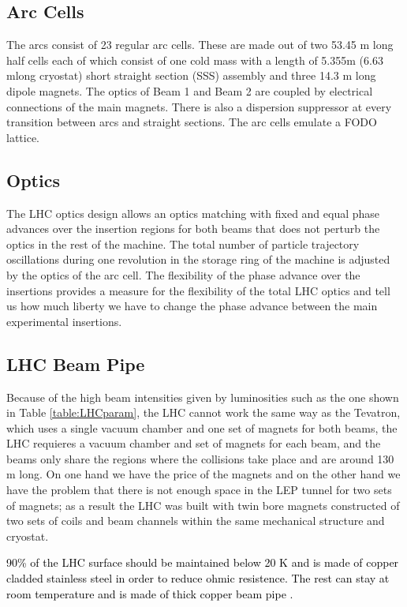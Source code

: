 \subsection{Arc Cells}
The arcs consist of 23 regular arc cells. These are made out of two 53.45 m long half cells each of which consist of one cold mass with a length of 5.355m (6.63 mlong cryostat) short straight section (SSS) assembly and three 14.3 m long dipole magnets. The optics of Beam 1 and Beam 2 are coupled by electrical connections of the main magnets. There is also a dispersion suppressor at every transition between arcs and straight sections. The arc cells emulate a FODO lattice\citep{DR}.
\subsection{Optics}
The LHC optics design allows an optics matching with fixed and equal phase advances over the insertion regions for both beams that does not perturb the optics in the rest of the machine. The total number of particle trajectory oscillations during one revolution in the storage ring of the machine is adjusted by the optics of the arc cell. The flexibility of the phase advance over the insertions provides a measure for the flexibility of the total LHC optics and tell us how much liberty we have to change the phase advance between the main experimental insertions\cite{DR}.

\subsection{LHC Beam Pipe}
Because of the high beam intensities given by luminosities such as the one shown in Table \ref{table:LHCparam}, the LHC cannot work the same way as the Tevatron, which uses a single vacuum chamber and one set of magnets for both beams, the LHC requieres a vacuum chamber and set of magnets for each beam, and the beams only share the regions where the collisions take place and are around 130 m long\citep{DR}.
On one hand we have the price of the magnets and on the other hand we have the problem that there is not enough space in the LEP tunnel for two sets of magnets; as a result the LHC was built with twin bore magnets constructed of two sets of coils and beam channels within the same mechanical structure and cryostat\citep{DR}.

\textcolor{black}{90\% of the LHC surface should be maintained below 20 K and is made of copper cladded stainless steel in order to reduce ohmic resistence. The rest can stay at room temperature and is made of thick copper beam pipe \citep{DR}.}


